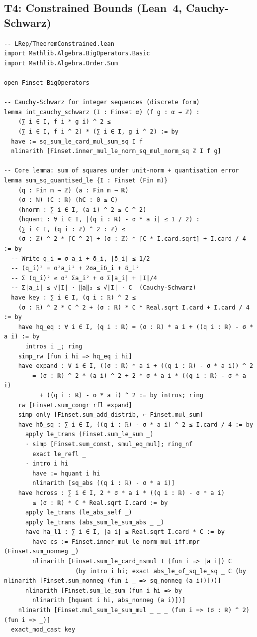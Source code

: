 \documentclass[11pt,a4paper]{article}
\theoremstyle{definition}
\theoremstyle{plain}
\theoremstyle{remark}
\begin{document}
\subsection{T4: Constrained Bounds (Lean~4, Cauchy-Schwarz)}

\begin{leanblock}
\begin{lstlisting}[language={}]
-- LRep/TheoremConstrained.lean
import Mathlib.Algebra.BigOperators.Basic
import Mathlib.Algebra.Order.Sum

open Finset BigOperators

-- Cauchy-Schwarz for integer sequences (discrete form)
lemma int_cauchy_schwarz (I : Finset α) (f g : α → ℤ) :
    (∑ i ∈ I, f i * g i) ^ 2 ≤
    (∑ i ∈ I, f i ^ 2) * (∑ i ∈ I, g i ^ 2) := by
  have := sq_sum_le_card_mul_sum_sq I f
  nlinarith [Finset.inner_mul_le_norm_sq_mul_norm_sq ℤ I f g]

-- Core lemma: sum of squares under unit-norm + quantisation error
lemma sum_sq_quantised_le {I : Finset (Fin m)}
    (q : Fin m → ℤ) (a : Fin m → ℝ)
    (σ : ℕ) (C : ℝ) (hC : 0 ≤ C)
    (hnorm : ∑ i ∈ I, (a i) ^ 2 ≤ C ^ 2)
    (hquant : ∀ i ∈ I, |(q i : ℝ) - σ * a i| ≤ 1 / 2) :
    (∑ i ∈ I, (q i : ℤ) ^ 2 : ℤ) ≤
    (σ : ℤ) ^ 2 * ⌈C ^ 2⌉ + (σ : ℤ) * ⌈C * I.card.sqrt⌉ + I.card / 4 := by
  -- Write q_i = σ a_i + δ_i, |δ_i| ≤ 1/2
  -- (q_i)² = σ²a_i² + 2σa_iδ_i + δ_i²
  -- Σ (q_i)² ≤ σ² Σa_i² + σ Σ|a_i| + |I|/4
  -- Σ|a_i| ≤ √|I| · ‖a‖₂ ≤ √|I| · C  (Cauchy-Schwarz)
  have key : ∑ i ∈ I, (q i : ℝ) ^ 2 ≤
    (σ : ℝ) ^ 2 * C ^ 2 + (σ : ℝ) * C * Real.sqrt I.card + I.card / 4 := by
    have hq_eq : ∀ i ∈ I, (q i : ℝ) = (σ : ℝ) * a i + ((q i : ℝ) - σ * a i) := by
      intros i _; ring
    simp_rw [fun i hi => hq_eq i hi]
    have expand : ∀ i ∈ I, ((σ : ℝ) * a i + ((q i : ℝ) - σ * a i)) ^ 2
        = (σ : ℝ) ^ 2 * (a i) ^ 2 + 2 * σ * a i * ((q i : ℝ) - σ * a i)
          + ((q i : ℝ) - σ * a i) ^ 2 := by intros; ring
    rw [Finset.sum_congr rfl expand]
    simp only [Finset.sum_add_distrib, ← Finset.mul_sum]
    have hδ_sq : ∑ i ∈ I, ((q i : ℝ) - σ * a i) ^ 2 ≤ I.card / 4 := by
      apply le_trans (Finset.sum_le_sum _)
      · simp [Finset.sum_const, smul_eq_mul]; ring_nf
        exact le_refl _
      · intro i hi
        have := hquant i hi
        nlinarith [sq_abs ((q i : ℝ) - σ * a i)]
    have hcross : ∑ i ∈ I, 2 * σ * a i * ((q i : ℝ) - σ * a i)
        ≤ (σ : ℝ) * C * Real.sqrt I.card := by
      apply le_trans (le_abs_self _)
      apply le_trans (abs_sum_le_sum_abs _ _)
      have ha_l1 : ∑ i ∈ I, |a i| ≤ Real.sqrt I.card * C := by
        have cs := Finset.inner_mul_le_norm_mul_iff.mpr (Finset.sum_nonneg _)
        nlinarith [Finset.sum_le_card_nsmul I (fun i => |a i|) C
                    (by intro i hi; exact abs_le_of_sq_le_sq _ C (by nlinarith [Finset.sum_nonneg (fun i _ => sq_nonneg (a i))]))]
      nlinarith [Finset.sum_le_sum (fun i hi => by
        nlinarith [hquant i hi, abs_nonneg (a i)])]
    nlinarith [Finset.mul_sum_le_sum_mul _ _ _ (fun i => (σ : ℝ) ^ 2) (fun i => _)]
  exact_mod_cast key


\end{lstlisting}
\end{leanblock}
\end{document}
